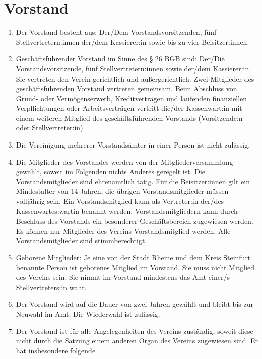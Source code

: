 \documentclass[12pt]{article}
\begin{document}
\section{Vorstand}
\begin{enumerate}[label=(\arabic*)]
	\item Der Vorstand besteht aus:
	      Der/Dem Vorstandsvorsitzenden, fünf Stellvertretern:innen der/dem Kassierer:in sowie bis zu vier
	      Beisitzer:innen.
	\item Geschäftsführender Vorstand im Sinne des § 26 BGB sind:
	      Der/Die Vorstandsvorsitzende, fünf Stellvertretern:innen sowie der/dem Kassierer:in.
	      Sie vertreten den Verein gerichtlich und außergerichtlich. Zwei Mitglieder des geschäftsführenden
	      Vorstand vertreten gemeinsam.
	      Beim Abschluss von Grund- oder Vermögenserwerb, Kreditverträgen und laufenden finanziellen
	      Verpflichtungen oder Arbeitsverträgen vertritt die/der Kassenwart:in mit einem weiteren Mitglied des
	      geschäftsführenden Vorstands (Vorsitzende:n oder Stellvertreter:in).
	\item Die Vereinigung mehrerer Vorstandsämter in einer Person ist nicht zulässig.
	\item Die Mitglieder des Vorstandes werden von der Mitgliederversammlung gewählt, soweit im
	      Folgenden nichts Anderes geregelt ist.
	      Die Vorstandsmitglieder sind ehrenamtlich tätig. Für die Beisitzer:innen gilt ein Mindestalter von 14
	      Jahren, die übrigen Vorstandsmitglieder müssen volljährig sein.
	      Ein Vorstandsmitglied kann als Vertreter:in der/des Kassenwartes:wartin benannt werden.
	      Vorstandsmitgliedern kann durch Beschluss des Vorstands ein besonderer Geschäftsbereich
	      zugewiesen werden.
	      Es können nur Mitglieder des Vereins Vorstandsmitglied werden. Alle Vorstandsmitglieder sind
	      stimmberechtigt.
	\item Geborene Mitglieder:
	      Je eine von der Stadt Rheine und dem Kreis Steinfurt benannte Person ist geborenes Mitglied im
	      Vorstand. Sie muss nicht Mitglied des Vereins sein. Sie nimmt im Vorstand mindestens das Amt
	      einer/s Stellvertreters:in wahr.
	\item Der Vorstand wird auf die Dauer von zwei Jahren gewählt und bleibt bis zur Neuwahl im Amt. Die
	      Wiederwahl ist zulässig.
	\item Der Vorstand ist für alle Angelegenheiten des Vereins zuständig, soweit diese nicht durch die
	      Satzung einem anderen Organ des Vereins zugewiesen sind. Er hat insbesondere folgende

\end{enumerate}
\end{document}
